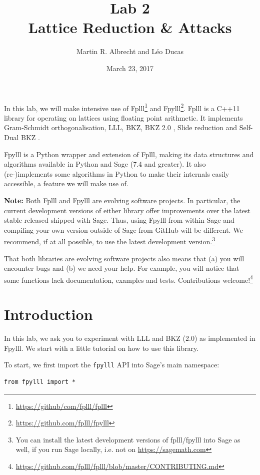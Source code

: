 \documentclass[10pt,a4paper,nobib]{tufte-handout}
\author{Martin R. Albrecht and Léo Ducas}
\date{March 23, 2017}
\title{Lab 2\\\medskip
\large Lattice Reduction \& Attacks}
\begin{document}
\maketitle
In this lab, we will make intensive use of Fplll\footnote{\url{https://github/com/fplll/fplll}} and Fpylll\footnote{\url{https://github.com/fplll/fpylll}}. Fplll is a C++11 library for operating on lattices using floating point arithmetic. It implements Gram-Schmidt orthogonalisation, LLL, BKZ, BKZ 2.0 , Slide reduction  and Self-Dual BKZ .

Fpylll is a Python wrapper and extension of Fplll, making its data structures and algorithms available in Python and Sage (7.4 and greater). It also (re-)implements some algorithms in Python to make their internals easily accessible, a feature we will make use of.

\textbf{Note:} Both Fplll and Fpylll are evolving software projects. In particular, the current development versions of either library offer improvements over the latest stable released shipped with Sage. Thus, using Fpylll from within Sage and compiling your own version outside of Sage from GitHub will be different. We recommend, if at all possible, to use the latest development version.\footnote{You can install the latest development versions of fplll/fpylll into Sage as well, if you run Sage locally, i.e. not on \url{https://sagemath.com}}

That both libraries are evolving software projects also means that (a) you will encounter bugs and (b) we need your help. For example, you will notice that some functions lack documentation, examples and tests. Contributions welcome!\footnote{\url{https://github.com/fplll/fplll/blob/master/CONTRIBUTING.md}}

\section{Introduction}
\label{sec:orgc87df07}
In this lab, we ask you to experiment with LLL and BKZ (2.0) as implemented in Fpylll. We start with a little tutorial on how to use this library. 

To start, we first import the \texttt{fpylll} API into Sage’s main namespace:

\lstset{language=sage,label= ,caption= ,captionpos=b,numbers=none}
\begin{lstlisting}
from fpylll import *
\end{lstlisting}
\end{document}

